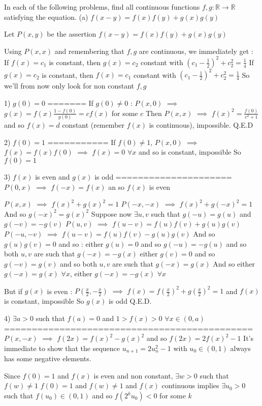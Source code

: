 \begin{solution}
	\begin{tcolorbox}In each of the following problems, find all continuous functions $f,g:\mathbb{R}\to \mathbb{R}$ satisfying the equation.
(a)	$f(x-y)=f(x)f(y)+g(x)g(y)$\end{tcolorbox}
Let $P(x,y)$ be the assertion $f(x-y)=f(x)f(y)+g(x)g(y)$

Using $P(x,x)$ and remembering that $f,g$ are continuous, we immediately get :
If $f(x)=c_1$ is constant, then $g(x)=c_2$ constant with $(c_1-\frac 12)^2+c_2^2=\frac 14$ 
If $g(x)=c_2$ is constant, then $f(x)=c_1$ constant with $(c_1-\frac 12)^2+c_2^2=\frac 14$ 
So we'll from now only look for non constant $f,g$


1) $g(0)=0$
=======
If $g(0)\ne 0$ : 
$P(x,0)$ $\implies$ $g(x)=f(x)\frac{1-f(0)}{g(0)}=cf(x)$ for some $c$
Then $P(x,x)$ $\implies$ $f(x)^2=\frac{f(0)}{c^2+1}$ and so $f(x)=d$ constant (remember $f(x)$ is continuous), impossible.
Q.E.D

2) $f(0)=1$
===========
If $f(0)\ne 1$, $P(x,0)$ $\implies$ $f(x)=f(x)f(0)$ $\implies$ $f(x)=0$ $\forall x$ and so is constant, impossible
So $f(0)=1$

3) $f(x)$ is even and $g(x)$ is odd
=====================
$P(0,x)$ $\implies$ $f(-x)=f(x)$ an so $f(x)$ is even

$P(x,x)$ $\implies$ $f(x)^2+g(x)^2=1$
$P(-x,-x)$ $\implies$ $f(x)^2+g(-x)^2=1$
And so $g(-x)^2=g(x)^2$
Suppose now $\exists u,v$ such that $g(-u)=g(u)$ and $g(-v)=-g(v)$
$P(u,v)$ $\implies$ $f(u-v)=f(u)f(v)+g(u)g(v)$
$P(-u,-v)$ $\implies$ $f(u-v)=f(u)f(v)-g(u)g(v)$
And so $g(u)g(v)=0$ and so :
either $g(u)=0$ and so $g(-u)=-g(u)$ and so both $u,v$ are such that $g(-x)=-g(x)$
either $g(v)=0$ and so $g(-v)=g(v)$ and so both $u,v$ are such that $g(-x)=g(x)$
And so either $g(-x)=g(x)$ $\forall x$, either $g(-x)=-g(x)$ $\forall x$

But if $g(x)$ is even : $P(\frac x2,-\frac x2)$ $\implies$ $f(x)=f(\frac x2)^2+g(\frac x2)^2=1$ and $f(x)$ is constant, impossible
So $g(x)$ is odd
Q.E.D.

4) $\exists a>0$ such that $f(a)=0$ and $1>f(x)>0$ $\forall x\in (0,a)$
=============================================
$P(x,-x)$ $\implies$ $f(2x)=f(x)^2-g(x)^2$ and so $f(2x)=2f(x)^2-1$
It's immediate to show that the sequence $u_{n+1}=2u_n^2-1$ with $u_0\in (0,1)$ always has some negative elements.

Since $f(0)=1$ and $f(x)$ is even and non constant, $\exists w>0$ such that $f(w)\ne 1$
$f(0)=1$ and $f(w)\ne 1$ and $f(x)$ continuous implies $\exists u_0>0$ such that $f(u_0)\in(0,1)$ and so $f(2^ku_0)<0$ for some $k$


\end{solution}

